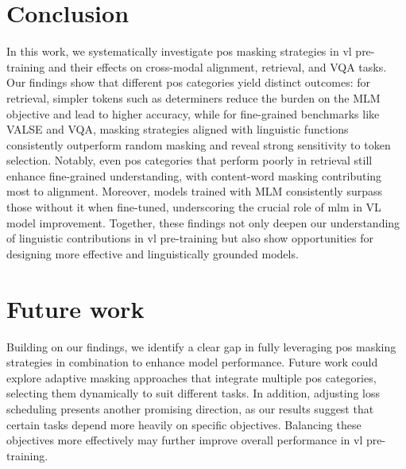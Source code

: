 \section{Conclusion}
In this work, we systematically investigate \acrshort{pos} masking strategies in \Acrshort{vl} pre-training and their effects on cross-modal alignment, retrieval, and VQA tasks.
Our findings show that different \acrshort{pos} categories yield distinct outcomes: for retrieval, simpler tokens such as determiners reduce the burden on the MLM objective and lead to higher accuracy, while for fine-grained benchmarks like VALSE and VQA, masking strategies aligned with linguistic functions consistently outperform random masking and reveal strong sensitivity to token selection.
Notably, even \acrshort{pos} categories that perform poorly in retrieval still enhance fine-grained understanding, with content-word masking contributing most to alignment.
Moreover, models trained with MLM consistently surpass those without it when fine-tuned, underscoring the crucial role of \acrshort{mlm} in VL model improvement.
Together, these findings not only deepen our understanding of linguistic contributions in \acrshort{vl} pre-training but also show opportunities for designing more effective and linguistically grounded models.

\section{Future work}
Building on our findings, we identify a clear gap in fully leveraging \acrshort{pos} masking strategies in combination to enhance model performance.
Future work could explore adaptive masking approaches that integrate multiple \acrshort{pos} categories, selecting them dynamically to suit different tasks.
In addition, adjusting loss scheduling presents another promising direction, as our results suggest that certain tasks depend more heavily on specific objectives.
Balancing these objectives more effectively may further improve overall performance in \acrshort{vl} pre-training.